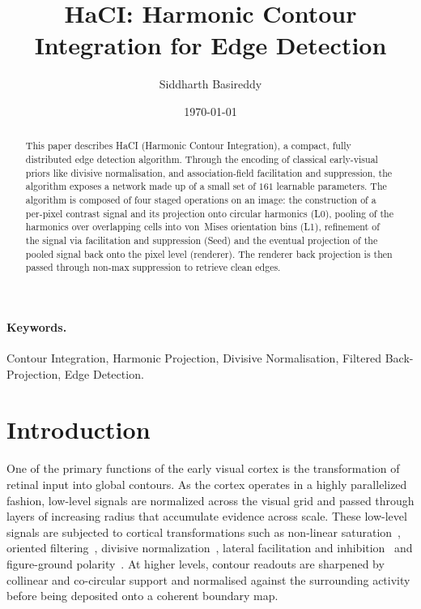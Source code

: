 \documentclass[11pt,a4paper]{article}
\title{HaCI: Harmonic Contour Integration for Edge Detection}
\author{%
  Siddharth Basireddy%
}
\date{\today}
\begin{document}
\maketitle

\begin{abstract}
This paper describes HaCI (Harmonic Contour Integration), a compact, fully distributed edge detection algorithm. Through the encoding of classical early-visual priors like divisive normalisation, and association-field facilitation and suppression, the algorithm exposes a network made up of a small set of $161$ learnable parameters. The algorithm is composed of four staged operations on an image: the construction of a per-pixel contrast signal and its projection onto circular harmonics (L0), pooling of the harmonics over overlapping cells into von~Mises orientation bins (L1), refinement of the signal via facilitation and suppression (Seed) and the eventual projection of the pooled signal back onto the pixel level (renderer). The renderer back projection is then passed through non-max suppression to retrieve clean edges.
\end{abstract}

\paragraph{Keywords.} Contour Integration, Harmonic Projection, Divisive Normalisation, Filtered Back-Projection, Edge Detection.

\section{Introduction}\label{sec:intro}

One of the primary functions of the early visual cortex is the transformation of retinal input into global contours. As the cortex operates in a highly parallelized fashion, low-level signals are normalized across the visual grid and passed through layers of increasing radius that accumulate evidence across scale. These low-level signals are subjected to cortical transformations such as non-linear saturation~\cite{naka1966srod}, oriented filtering~\cite{hubel1962orientation}, divisive normalization~\cite{heeger1992normalisation,cavanaugh2002surround}, lateral facilitation and inhibition~\cite{kapadia1995dynamics,field1993contour} and figure-ground polarity~\cite{zhou2000border}. At higher levels, contour readouts are sharpened by collinear and co-circular support and normalised against the surrounding activity before being deposited onto a coherent boundary map.
\end{document}

